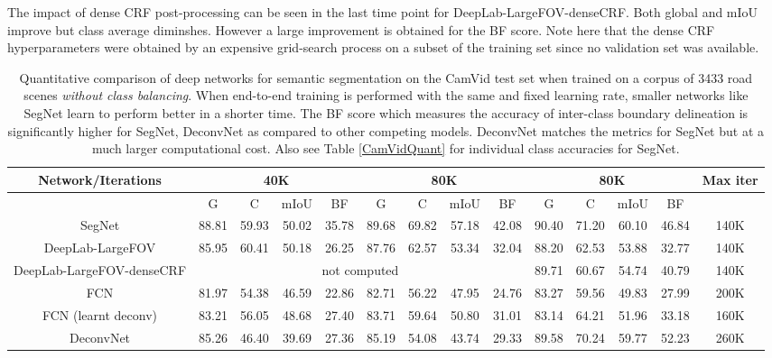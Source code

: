 \documentclass[10pt,journal,compsoc]{IEEEtran}
\begin{document}
The impact of dense CRF \cite{koltun2011efficient} post-processing can be seen in the last time point for DeepLab-LargeFOV-denseCRF. Both global and mIoU improve but class average diminshes. However a large improvement is obtained for the BF score. Note here that the dense CRF hyperparameters were obtained by an expensive grid-search process on a subset of the training set since no validation set was available.

\begin{table*}[t]
\centering
\tabcolsep=2pt
\begin{tabular}{|c|c|c|c|c||c|c|c|c||c|c|c|c|c|}
\hline
Network/Iterations       & \multicolumn{4}{c||}{40K} & \multicolumn{4}{c||}{80K} & \multicolumn{4}{c|}{80K} & Max iter \\ \hline \hline
  & G & C & mIoU & BF & G & C & mIoU & BF & G & C & mIoU & BF & \\ \hline 

SegNet   & 88.81 & 59.93 & 50.02 & 35.78 & 89.68 & 69.82 &   57.18 & 42.08 &90.40 & 71.20  &60.10  & 46.84 & 140K\\ \hline
DeepLab-LargeFOV\cite{liang2015semantic} & 85.95 & 60.41 & 50.18 & 26.25 & 87.76 & 62.57 & 53.34 & 32.04 & 88.20 & 62.53 & 53.88 & 32.77 & 140K\\ \hline
DeepLab-LargeFOV-denseCRF\cite{liang2015semantic} & \multicolumn{8}{c|}{not computed} & 89.71 & 60.67 & 54.74 & 40.79 & 140K\\ \hline
FCN & 81.97 & 54.38 & 46.59 & 22.86  &82.71 & 56.22 & 47.95 & 24.76& 83.27 & 59.56 & 49.83 & 27.99 & 200K \\  \hline
FCN (learnt deconv) \cite{FCN} &83.21 &56.05 & 48.68 &27.40 & 83.71 & 59.64 & 50.80 & 31.01 & 83.14 & 64.21 & 51.96 & 33.18 & 160K \\ \hline
DeconvNet \cite{noh2015learning} & 85.26 & 46.40 & 39.69 & 27.36 & 85.19 & 54.08 &43.74 & 29.33 & 89.58 & 70.24 & 59.77 & 52.23 & 260K \\ \hline 
\end{tabular}
\vspace*{0.1cm}
\caption{\footnotesize{Quantitative comparison of deep networks for semantic segmentation on the CamVid test set when trained on a corpus of 3433 road scenes \textit{without class balancing}. When end-to-end training is performed with the same and fixed learning rate, smaller networks like SegNet learn to perform better in a shorter time. The BF score which measures the accuracy of inter-class boundary delineation is significantly higher for SegNet, DeconvNet as compared to other competing models. DeconvNet matches the metrics for SegNet but at a much larger computational cost.  Also see Table \ref{CamVidQuant} for individual class accuracies for SegNet.}}
\label{CamvidDeepBenchmark}
\end{table*}
\end{document}
